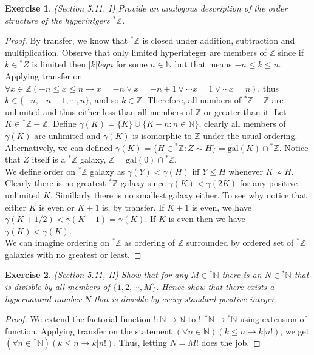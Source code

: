 \documentclass[a4paper, 11pt]{book}
\theoremstyle{plain}
\newtheorem{exercise}{Exercise}[chapter]
\theoremstyle{plain}
\newcommand{\arr}{\rightarrow}
\newcommand{\N}{\mathbb{N}}
\newcommand{\Z}{\mathbb{Z}}
\newcommand{\hyp}{{}^*}
\newcommand{\gal}{\text{gal}}
\begin{document}
  \begin{exercise}
    (Section 5.11, I)
    Provide an analogous description of the order structure of the hyperintgers $\hyp \Z$.
  \end{exercise}
  \begin{proof}
    By transfer, we know that $\hyp \Z$ is closed under addition, subtraction and multiplication. Observe that only limited hyperinteger are members of $\Z$ since if $k \in \hyp Z$ is limited then $|k| leq n$ for some $n \in \N$ but that means $-n \leq k \leq n$. Applying transfer on $\forall x \in \Z (-n \leq x \leq n \rightarrow x=-n \lor x=-n+1 \lor \cdots x=1 \lor \cdots x=n)$, thus $k \in \{-n, -n+1, \cdots, n\}$, and so $k \in \Z$. Therefore, all numbers of $\hyp \Z-\Z$ are unlimited and thus either less than all members of $\Z$ or greater than it. Let $K \in \hyp \Z - \Z$. Define $\gamma (K)=\{K\} \cup \{K \pm n: n \in \N\}$, clearly all members of $\gamma(K)$ are unlimited and $\gamma(K)$ is isomorphic to $\Z$ under the usual ordering. Alternatively, we can defined $\gamma(K)=\{H \in \hyp \Z: Z \sim H\}=\gal(K) \cap \hyp \Z$. Notice that $Z$ itself is a $\hyp \Z$ galaxy, $\Z=\gal(0) \cap \hyp \Z$. \\

    We define order on $\hyp \Z$ galaxy as $\gamma(Y)< \gamma (H)$ iff $Y \leq H$ whenever $K \not \sim H$. Clearly there is no greatest $\hyp \Z$ galaxy since $\gamma(K)< \gamma (2K)$ for any positive unlimited $K$. Simillarly there is no smallest galaxy either. To see why notice that either $K$ is even or $K+1$ is, by transfer. If $K+1$ is even, we have $\gamma(K+1/2)<\gamma(K+1)=\gamma(K)$. If $K$ is even then we have $\gamma(K)<\gamma(K)$. \\

    We can imagine ordering on $\hyp \Z$ as ordering of $\Z$ surrounded by ordered set of $\hyp \Z$ galaxies with no greatest or least.
  \end{proof}

  \begin{exercise}
    (Section 5.11, II)
    Show that for any $M \in \hyp \N$ there is an $N \in \hyp \N$ that is divisble by all members of $\{1,2,\cdots, M\}$. Hence show that there exists a hypernatural number $N$ that is divisble by every standard positive integer.
  \end{exercise}
  \begin{proof}
    We extend the factorial function $!:\N \rightarrow \N$ to $!:\hyp \N \arr \hyp \N$ using extension of function. Applying transfer on the statement $(\forall n \in \N)(k \leq n \arr k|n!)$, we get $(\forall n \in \hyp \N)(k \leq n \arr k|n!)$. Thus, letting $N=M!$ does the job.
  \end{proof}
\end{document}
